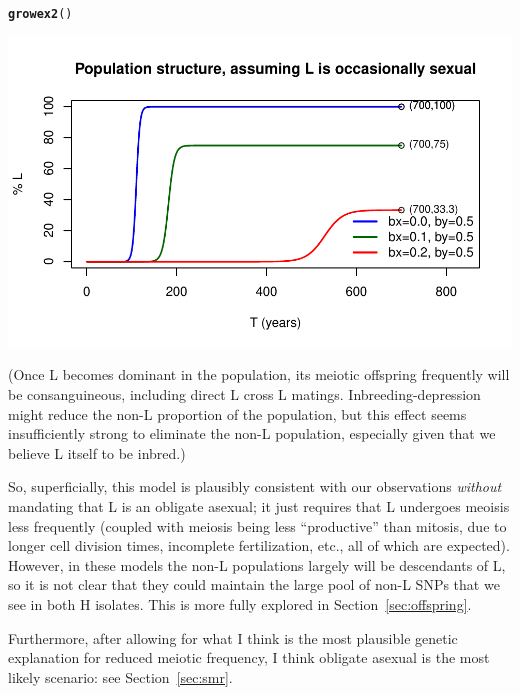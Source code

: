 \documentclass{article}\usepackage[]{graphicx}\usepackage[]{color}
\makeatletter
\def\maxwidth{ %
  \ifdim\Gin@nat@width>\linewidth
    \linewidth
  \else
    \Gin@nat@width
  \fi
}
\newcommand{\hlstd}[1]{\textcolor[rgb]{0.345,0.345,0.345}{#1}}%
\newcommand{\hlkwd}[1]{\textcolor[rgb]{0.737,0.353,0.396}{\textbf{#1}}}%
\newenvironment{kframe}{%
 \def\at@end@of@kframe{}%
 \ifinner\ifhmode%
  \def\at@end@of@kframe{\end{minipage}}%
  \begin{minipage}{\columnwidth}%
 \fi\fi%
 \def\FrameCommand##1{\hskip\@totalleftmargin \hskip-\fboxsep
 \colorbox{shadecolor}{##1}\hskip-\fboxsep
     \hskip-\linewidth \hskip-\@totalleftmargin \hskip\columnwidth}%
 \MakeFramed {\advance\hsize-\width
   \@totalleftmargin\z@ \linewidth\hsize
   \@setminipage}}%
 {\par\unskip\endMakeFramed%
 \at@end@of@kframe}
\newenvironment{knitrout}{}{} %
\makeatother
\begin{document}
\begin{knitrout}\footnotesize
{}\color{fgcolor}\begin{kframe}
\begin{alltt}
\hlkwd{growex2}\hlstd{()}
\end{alltt}
\end{kframe}

{\centering \includegraphics[width=\maxwidth]{asex-figs-knitr/slow-sex-is-exponential-1} 

}



\end{knitrout}

(Once L becomes dominant in the population, its meiotic offspring frequently will be consanguineous,
including direct L cross L matings.  Inbreeding-depression might reduce the non-L proportion of the
population, but this effect seems insufficiently strong to eliminate the non-L population,
especially given that we believe L itself to be inbred.)

So, superficially, this model is plausibly consistent with our observations \textit{without}
mandating that L is an obligate asexual; it just requires that L undergoes meoisis less frequently
(coupled with meiosis being less ``productive'' than mitosis, due to longer cell division times,
incomplete fertilization, etc., all of which are expected).  However, in these models the non-L
populations largely will be descendants of L, so it is not clear that they could maintain the large
pool of non-L SNPs that we see in both H isolates.  This is more fully explored in
Section~\ref{sec:offspring}.

Furthermore, after allowing for what I think is the most plausible genetic explanation for reduced
meiotic frequency, I think obligate asexual is the most likely scenario: see Section~\ref{sec:smr}.
\end{document}
